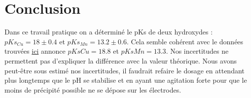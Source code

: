 \documentclass[12pt]{article}
\begin{document}
\newpage
\section*{Conclusion}
Dans ce travail pratique on a déterminé le pKs de deux hydroxydes : $pKs_{Cu}=18\pm 0.4$ et $pKs_{Mn}=13.2\pm 0.6$. Cela semble cohérent avec le données trouvées \href{https://owl.oit.umass.edu/departments/Chemistry/appendix/ksp.html}{ici} annonce $pKs{Cu}=18.8$ et $pKs{Mn}=13.3$.
 Nos incertitudes ne permettent pas d'expliquer la différence avec la valeur théorique. Nous avons peut-être sous estimé nos incertitudes, il faudrait refaire le dosage en attendant plus longtemps que le pH se stabilise et en ayant une agitation forte pour que le moins de précipité possible ne se dépose sur les électrodes. 
\end{document}
